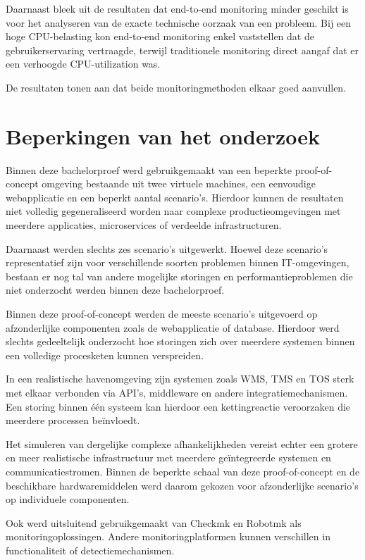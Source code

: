 Daarnaast bleek uit de resultaten dat end-to-end monitoring minder geschikt is voor het analyseren van de exacte technische oorzaak van een probleem. Bij een hoge CPU-belasting kon end-to-end monitoring enkel vaststellen dat de gebruikerservaring vertraagde, terwijl traditionele monitoring direct aangaf dat er een verhoogde CPU-utilization was.

De resultaten tonen aan dat beide monitoringmethoden elkaar goed aanvullen.

\section{Beperkingen van het onderzoek}

Binnen deze bachelorproef werd gebruikgemaakt van een beperkte proof-of-concept omgeving bestaande uit twee virtuele machines, een eenvoudige webapplicatie en een beperkt aantal scenario’s. Hierdoor kunnen de resultaten niet volledig gegeneraliseerd worden naar complexe productieomgevingen met meerdere applicaties, microservices of verdeelde infrastructuren.

Daarnaast werden slechts zes scenario’s uitgewerkt. Hoewel deze scenario’s representatief zijn voor verschillende soorten problemen binnen IT-omgevingen, bestaan er nog tal van andere mogelijke storingen en performantieproblemen die niet onderzocht werden binnen deze bachelorproef.

Binnen deze proof-of-concept werden de meeste scenario’s uitgevoerd op afzonderlijke componenten zoals de webapplicatie of database. Hierdoor werd slechts gedeeltelijk onderzocht hoe storingen zich over meerdere systemen binnen een volledige procesketen kunnen verspreiden.

In een realistische havenomgeving zijn systemen zoals WMS, TMS en TOS sterk met elkaar verbonden via API’s, middleware en andere integratiemechanismen. Een storing binnen één systeem kan hierdoor een kettingreactie veroorzaken die meerdere processen beïnvloedt.

Het simuleren van dergelijke complexe afhankelijkheden vereist echter een grotere en meer realistische infrastructuur met meerdere geïntegreerde systemen en communicatiestromen. Binnen de beperkte schaal van deze proof-of-concept en de beschikbare hardwaremiddelen werd daarom gekozen voor afzonderlijke scenario’s op individuele componenten.

Ook werd uitsluitend gebruikgemaakt van Checkmk en Robotmk als monitoringoplossingen. Andere monitoringplatformen kunnen verschillen in functionaliteit of detectiemechanismen.

